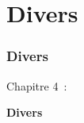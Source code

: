 %

\section{Divers}
\begin{frame}[fragile]
	\frametitle{Divers}

	\begin{center}\huge{Chapitre 4~:}\end{center}
	\begin{center}\huge{\color{typo3darkgrey}\textbf{Divers}}\end{center}

\end{frame}

